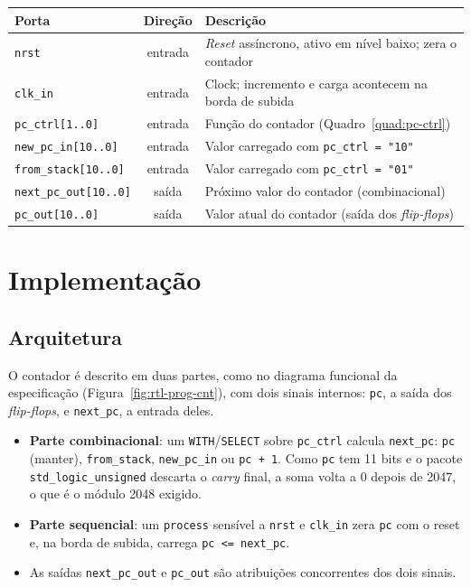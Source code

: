 \begin{quadro}[htb]
  \caption{Portas do contador de programa.}
  \label{quad:portas-prog-cnt}
  \centering
  \begin{tabular}{lcp{8.8cm}}
    \hline
    Porta & Direção & Descrição \\ \hline
    \texttt{nrst} & entrada & \textit{Reset} assíncrono, ativo em nível baixo; zera o contador \\
    \texttt{clk\_in} & entrada & Clock; incremento e carga acontecem na borda de subida \\
    \texttt{pc\_ctrl[1..0]} & entrada & Função do contador (Quadro~\ref{quad:pc-ctrl}) \\
    \texttt{new\_pc\_in[10..0]} & entrada & Valor carregado com \texttt{pc\_ctrl = "10"} \\
    \texttt{from\_stack[10..0]} & entrada & Valor carregado com \texttt{pc\_ctrl = "01"} \\
    \texttt{next\_pc\_out[10..0]} & saída & Próximo valor do contador (combinacional) \\
    \texttt{pc\_out[10..0]} & saída & Valor atual do contador (saída dos \textit{flip-flops}) \\ \hline
  \end{tabular}
\end{quadro}

\section{Implementação}

\subsection{Arquitetura}

O contador é descrito em duas partes, como no diagrama funcional da especificação (Figura~\ref{fig:rtl-prog-cnt}), com dois sinais internos: \texttt{pc}, a saída dos \textit{flip-flops}, e \texttt{next\_pc}, a entrada deles.

\begin{itemize}
  \item \textbf{Parte combinacional}: um \texttt{WITH}/\texttt{SELECT} sobre \texttt{pc\_ctrl} calcula \texttt{next\_pc}: \texttt{pc} (manter), \texttt{from\_stack}, \texttt{new\_pc\_in} ou \texttt{pc + 1}. Como \texttt{pc} tem 11 bits e o pacote \texttt{std\_logic\_unsigned} descarta o \textit{carry} final, a soma volta a 0 depois de 2047, o que é o módulo 2048 exigido.
  \item \textbf{Parte sequencial}: um \texttt{process} sensível a \texttt{nrst} e \texttt{clk\_in} zera \texttt{pc} com o reset e, na borda de subida, carrega \texttt{pc <= next\_pc}.
  \item As saídas \texttt{next\_pc\_out} e \texttt{pc\_out} são atribuições concorrentes dos dois sinais.
\end{itemize}

